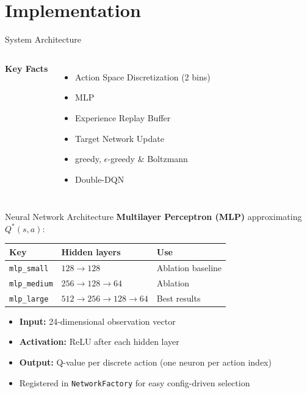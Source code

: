 \documentclass[aspectratio=169]{beamer}
\begin{document}
\section{Implementation}

\begin{frame}{System Architecture}
  \begin{columns}[c]
    \centering
    

    \textbf{Key Facts}
    \begin{itemize}
      \item Action Space Discretization (2 bins)
      \item MLP 
      \item Experience Replay Buffer
      \item Target Network Update
      \item greedy, $\epsilon$-greedy \& Boltzmann
      \item Double-DQN
    \end{itemize}
  \end{columns}
\end{frame}

\begin{frame}{Neural Network Architecture}
  \textbf{Multilayer Perceptron (MLP)} approximating $Q^*(s,a)$:

  \vspace{0.6em}
  \begin{center}
    \begin{tabular}{lll}
      \toprule
      \textbf{Key} & \textbf{Hidden layers} & \textbf{Use} \\
      \midrule
      \texttt{mlp\_small}  & $128 \to 128$                    & Ablation baseline \\
      \texttt{mlp\_medium} & $256 \to 128 \to 64$             & Ablation \\
      \texttt{mlp\_large}  & $512 \to 256 \to 128 \to 64$     & Best results \\
      \bottomrule
    \end{tabular}
  \end{center}

  \vspace{0.6em}
  \begin{itemize}
    \item \textbf{Input:} 24-dimensional observation vector
    \item \textbf{Activation:} ReLU after each hidden layer
    \item \textbf{Output:} Q-value per discrete action (one neuron per action index)
    \item Registered in \texttt{NetworkFactory} for easy config-driven selection
  \end{itemize}
\end{frame}
\end{document}
